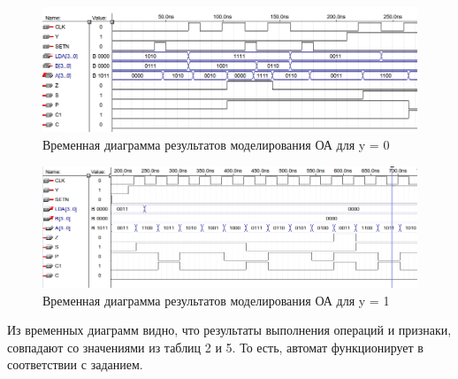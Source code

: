\begin{figure}[H]
	\includegraphics[scale=0.5]{images/altera/test_fin0.png}
	\caption{Временная диаграмма результатов моделирования ОА для y = 0}
	\label{figure:oafin0test}
\end{figure}

\begin{figure}[H]
	\includegraphics[scale=0.5]{images/altera/test_fin1.png}
	\caption{Временная диаграмма результатов моделирования ОА для y = 1}
	\label{figure:oafin1test}
\end{figure}

Из временных диаграмм видно, что результаты выполнения операций и признаки, совпадают со значениями из таблиц 2 и 5. То есть, автомат функционирует в соответствии с заданием.
